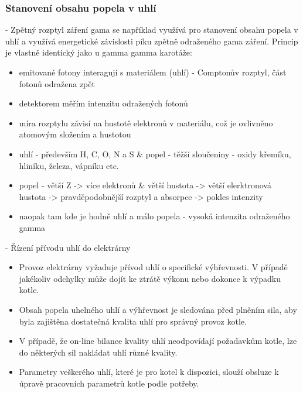 \subsubsection{Stanovení obsahu popela v uhlí}
- Zpětný rozptyl záření gama se například využívá pro stanovení obsahu popela v uhlí a využívá energetické závislosti píku zpětně odraženého gama záření. Princip je vlastně identický jako u gamma gamma karotáže:

\begin{itemize}
    \item emitované fotony interagují s materiálem (uhlí) - Comptonův rozptyl, část fotonů odražena zpět 
    \item detektorem měřím intenzitu odražených fotonů
    \item míra rozptylu závisí na hustotě elektronů v materiálu, což je ovlivněno atomovým složením a hustotou 
    \item uhlí - především H, C, O, N a S \& popel - těžší sloučeniny - oxidy křemíku, hliníku, železa, vápníku etc.
    \item popel - větší Z -> více elektronů \& větší hustota -> větší elerktronová hustota -> pravděpodobnější rozptyl a absorpce -> pokles intenzity
    \item naopak tam kde je hodně uhlí a málo popela - vysoká intenzita odraženého gamma
\end{itemize}


- Řízení přívodu uhlí do elektrárny
\begin{itemize}

     \item Provoz elektrárny vyžaduje přívod uhlí o specifické výhřevnosti. V
případě jakékoliv odchylky může dojít ke ztrátě výkonu nebo dokonce k
výpadku kotle.

     \item Obsah popela uhelného uhlí a výhřevnost je sledována před plněním
sila, aby byla zajištěna dostatečná kvalita uhlí pro správný provoz kotle.

    \item  V případě, že on-line bilance kvality uhlí neodpovídají požadavkům
kotle, lze do některých sil nakládat uhlí různé kvality.

    \item  Parametry veškerého uhlí, které je pro kotel k dispozici, slouží obsluze
k úpravě pracovních parametrů kotle podle potřeby.
\end{itemize}


